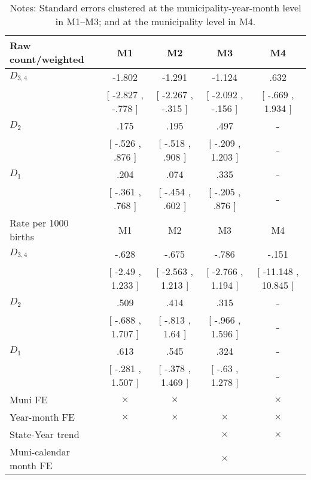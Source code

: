 \begin{table}[!ht]
\centering
\caption{Effects of Drought on LBW}\label{tab:twfe_lbw}
\fontsize{10pt}{12pt}\selectfont
\begin{tabular}{lcccc}
\toprule
  Raw count/weighted &\multicolumn{1}{c}{M1}&\multicolumn{1}{c}{M2}&\multicolumn{1}{c}{M3}&\multicolumn{1}{c}{M4} \\
\midrule
 $ D_{3,4} $ & -1.802 & -1.291 & -1.124 & .632 \\ 
 & [ -2.827 , -.778 ] & [ -2.267 , -.315 ] & [ -2.092 , -.156 ] & [ -.669 , 1.934 ] \\ 
\addlinespace
 $ D_2 $ & .175 & .195 & .497 & - \\ 
 & [ -.526 , .876 ] & [ -.518 , .908 ] & [ -.209 , 1.203 ] & - \\ 
\addlinespace
 $ D_1 $ & .204 & .074 & .335 & - \\ 
 & [ -.361 , .768 ] & [ -.454 , .602 ] & [ -.205 , .876 ] & - \\ 
\addlinespace
\midrule
  Rate per 1000 births &\multicolumn{1}{c}{M1}&\multicolumn{1}{c}{M2}&\multicolumn{1}{c}{M3}&\multicolumn{1}{c}{M4} \\
\midrule
 $ D_{3,4} $ & -.628 & -.675 & -.786 & -.151 \\ 
 & [ -2.49 , 1.233 ] & [ -2.563 , 1.213 ] & [ -2.766 , 1.194 ] & [ -11.148 , 10.845 ] \\ 
\addlinespace
 $ D_2 $ & .509 & .414 & .315 & - \\ 
 & [ -.688 , 1.707 ] & [ -.813 , 1.64 ] & [ -.966 , 1.596 ] & - \\ 
\addlinespace
 $ D_1 $ & .613 & .545 & .324 & - \\ 
 & [ -.281 , 1.507 ] & [ -.378 , 1.469 ] & [ -.63 , 1.278 ] & - \\ 
\midrule
  Muni FE & $ \times $ & $ \times $ &  & $ \times $  \\
  Year-month FE & $ \times $ & $ \times $ & $ \times $ & $ \times $ \\
  State-Year trend &  &  & $ \times $ & $ \times $ \\
  Muni-calendar month FE &  &  & $ \times $ & \\
\bottomrule
\end{tabular}
\caption*{\footnotesize{Notes: Standard errors clustered at the municipality-year-month level in M1--M3; and at the municipality level in M4.}}
\end{table}
